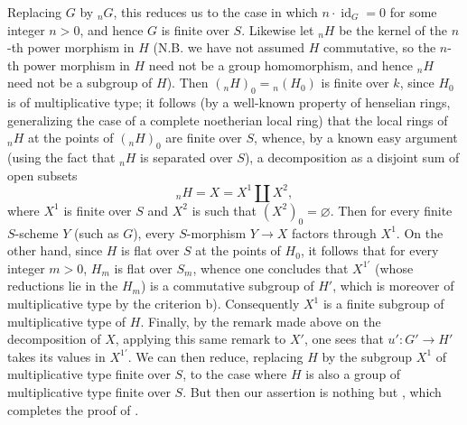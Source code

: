 Replacing \(G\) by \({}_nG\), this reduces us to the case in which
\(n\cdot\operatorname{id}_G=0\) for some integer \(n>0\), and hence \(G\)
is finite over \(S\). Likewise let \({}_nH\) be the kernel of the \(n\)-th
power morphism in \(H\) (N.B. we have not assumed \(H\) commutative, so the
\(n\)-th power morphism in \(H\) need not be a group homomorphism, and hence
\({}_nH\) need not be a subgroup of \(H\)). Then \(({}_nH)_0={}_n(H_0)\) is
finite over \(k\), since \(H_0\) is of multiplicative type; it follows (by a
well-known property of henselian rings, generalizing the case of a complete
noetherian local ring) that the local rings of \({}_nH\) at the points of
\(({}_nH)_0\) are finite over \(S\), whence, by a known easy argument (using
the fact that \({}_nH\) is separated over \(S\)), a decomposition as a
disjoint sum of open subsets
\[
  {}_nH=X=X^1\amalg X^2,
\]
where \(X^1\) is finite over \(S\) and \(X^2\) is such that
\((X^2)_0=\varnothing\). Then for every finite \(S\)-scheme \(Y\) (such as
\(G\)), every \(S\)-morphism \(Y\to X\) factors through \(X^1\). On the other
hand, since \(H\) is flat over \(S\) at the points of \(H_0\), it follows that
for every integer \(m>0\), \(H_m\) is flat over \(S_m\), whence one concludes
that \(X^{1\prime}\) (whose reductions lie in the \(H_m\)) is a commutative
subgroup of \(H'\), which is moreover of multiplicative type by the criterion
 b). Consequently \(X^1\) is a finite subgroup of multiplicative type
of \(H\). Finally, by the remark made above on the decomposition of \(X\),
applying this same remark to \(X'\), one sees that \(u':G'\to H'\) takes its
values in \(X^{1\prime}\). We can then reduce, replacing \(H\) by the subgroup
\(X^1\) of multiplicative type finite over \(S\), to the case where \(H\) is
also a group of multiplicative type finite over \(S\). But then our assertion
is nothing but , which completes the proof of .

